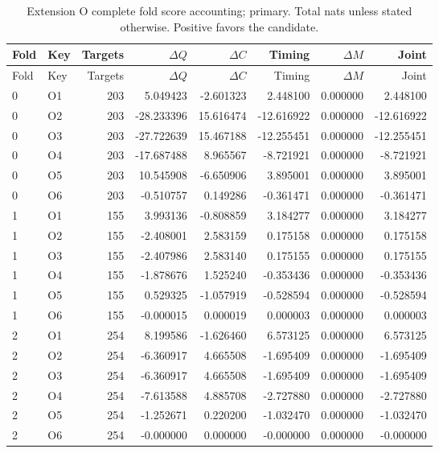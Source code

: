 {\small
\setlength{\tabcolsep}{3pt}
\begin{longtable}{llrrrrrr}
\caption{Extension O complete fold score accounting; primary. Total nats unless stated otherwise. Positive favors the candidate.}\label{tab:O-primary}\\
\toprule
Fold & Key & Targets & $\Delta Q$ & $\Delta C$ & Timing & $\Delta M$ & Joint\\\midrule
\endfirsthead
\toprule
Fold & Key & Targets & $\Delta Q$ & $\Delta C$ & Timing & $\Delta M$ & Joint\\\midrule
\endhead
0 & O1 & 203 & 5.049423 & -2.601323 & 2.448100 & 0.000000 & 2.448100\\
0 & O2 & 203 & -28.233396 & 15.616474 & -12.616922 & 0.000000 & -12.616922\\
0 & O3 & 203 & -27.722639 & 15.467188 & -12.255451 & 0.000000 & -12.255451\\
0 & O4 & 203 & -17.687488 & 8.965567 & -8.721921 & 0.000000 & -8.721921\\
0 & O5 & 203 & 10.545908 & -6.650906 & 3.895001 & 0.000000 & 3.895001\\
0 & O6 & 203 & -0.510757 & 0.149286 & -0.361471 & 0.000000 & -0.361471\\
1 & O1 & 155 & 3.993136 & -0.808859 & 3.184277 & 0.000000 & 3.184277\\
1 & O2 & 155 & -2.408001 & 2.583159 & 0.175158 & 0.000000 & 0.175158\\
1 & O3 & 155 & -2.407986 & 2.583140 & 0.175155 & 0.000000 & 0.175155\\
1 & O4 & 155 & -1.878676 & 1.525240 & -0.353436 & 0.000000 & -0.353436\\
1 & O5 & 155 & 0.529325 & -1.057919 & -0.528594 & 0.000000 & -0.528594\\
1 & O6 & 155 & -0.000015 & 0.000019 & 0.000003 & 0.000000 & 0.000003\\
2 & O1 & 254 & 8.199586 & -1.626460 & 6.573125 & 0.000000 & 6.573125\\
2 & O2 & 254 & -6.360917 & 4.665508 & -1.695409 & 0.000000 & -1.695409\\
2 & O3 & 254 & -6.360917 & 4.665508 & -1.695409 & 0.000000 & -1.695409\\
2 & O4 & 254 & -7.613588 & 4.885708 & -2.727880 & 0.000000 & -2.727880\\
2 & O5 & 254 & -1.252671 & 0.220200 & -1.032470 & 0.000000 & -1.032470\\
2 & O6 & 254 & -0.000000 & 0.000000 & -0.000000 & 0.000000 & -0.000000\\
\bottomrule
\end{longtable}
}

